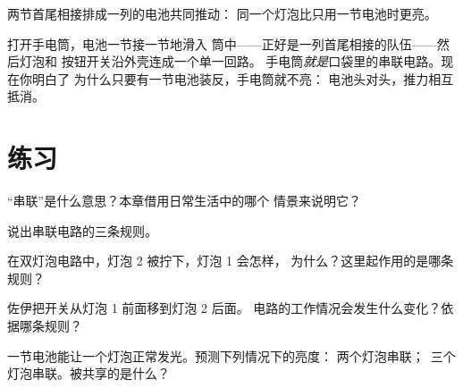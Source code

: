 \begin{omfigure}

{\small 两节首尾相接排成一列的电池共同推动：
同一个灯泡比只用一节电池时更亮。}
\end{omfigure}

\begin{example}[手电筒内部]\label{ex:g4:series-circuits:flashlight}
打开手电筒，电池一节接一节地滑入
筒中——正好是一列首尾相接的队伍——然后灯泡和
按钮开关沿外壳连成一个单一回路。
手电筒\emph{就是}口袋里的串联电路。现在你明白了
为什么只要有一节电池装反，手电筒就不亮：
电池头对头，推力相互抵消。
\end{example}

\section{练习}

\begin{exercise}[$\star$]\label{exo:g4:series-circuits:1}
“串联”是什么意思？本章借用日常生活中的哪个
情景来说明它？
\end{exercise}

\begin{exercise}[$\star$]\label{exo:g4:series-circuits:2}
说出串联电路的三条规则。
\end{exercise}

\begin{exercise}[$\star$]\label{exo:g4:series-circuits:3}
在双灯泡电路中，灯泡 2 被拧下，灯泡 1 会怎样，
为什么？这里起作用的是哪条规则？
\end{exercise}

\begin{exercise}[$\star$]\label{exo:g4:series-circuits:4}
佐伊把开关从灯泡 1 前面移到灯泡 2 后面。
电路的工作情况会发生什么变化？依据哪条规则？
\end{exercise}

\begin{exercise}[$\star$]\label{exo:g4:series-circuits:5}
一节电池能让一个灯泡正常发光。预测下列情况下的亮度：
两个灯泡串联；\ 三个灯泡串联。被共享的是什么？
\end{exercise}

